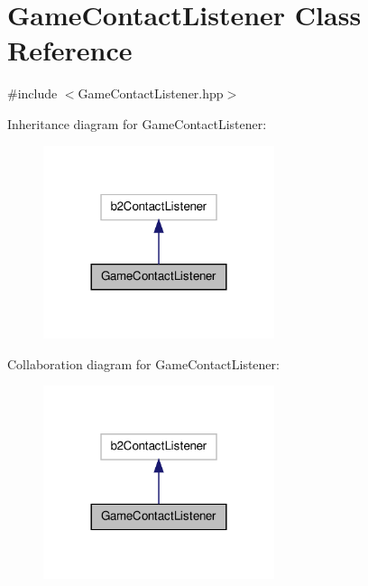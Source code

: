 \hypertarget{class_game_contact_listener}{\section{Game\-Contact\-Listener Class Reference}
\label{class_game_contact_listener}
}


{\ttfamily \#include $<$Game\-Contact\-Listener.\-hpp$>$}



Inheritance diagram for Game\-Contact\-Listener\-:\nopagebreak
\begin{figure}[H]
\begin{center}
\leavevmode
\includegraphics[width=192pt]{class_game_contact_listener__inherit__graph}
\end{center}
\end{figure}


Collaboration diagram for Game\-Contact\-Listener\-:\nopagebreak
\begin{figure}[H]
\begin{center}
\leavevmode
\includegraphics[width=192pt]{class_game_contact_listener__coll__graph}
\end{center}
\end{figure}
